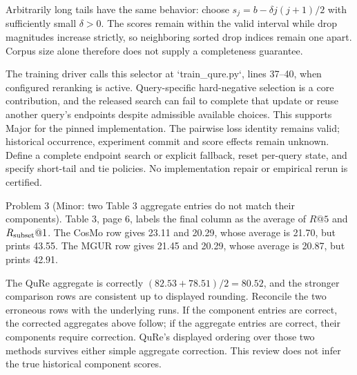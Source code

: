 \documentclass[10pt]{article}
\begin{document}
Arbitrarily long tails have the same behavior: choose \(s_j=b-\delta j(j+1)/2\) with sufficiently small \(\delta>0\). The scores remain within the valid interval while drop magnitudes increase strictly, so neighboring sorted drop indices remain one apart. Corpus size alone therefore does not supply a completeness guarantee.\par
The training driver calls this selector at `train\_qure.py`, lines 37–40, when configured reranking is active. Query-specific hard-negative selection is a core contribution, and the released search can fail to complete that update or reuse another query’s endpoints despite admissible available choices. This supports Major for the pinned implementation. The pairwise loss identity remains valid; historical occurrence, experiment commit and score effects remain unknown. Define a complete endpoint search or explicit fallback, reset per-query state, and specify short-tail and tie policies. No implementation repair or empirical rerun is certified.\par
Problem 3 (Minor: two Table 3 aggregate entries do not match their components).  Table 3, page 6, labels the final column as the average of \(R@5\) and \(R_{\rm subset}@1\). The CosMo row gives 23.11 and 20.29, whose average is 21.70, but prints 43.55. The MGUR row gives 21.45 and 20.29, whose average is 20.87, but prints 42.91.\par
The QuRe aggregate is correctly \((82.53+78.51)/2=80.52\), and the stronger comparison rows are consistent up to displayed rounding. Reconcile the two erroneous rows with the underlying runs. If the component entries are correct, the corrected aggregates above follow; if the aggregate entries are correct, their components require correction. QuRe’s displayed ordering over those two methods survives either simple aggregate correction. This review does not infer the true historical component scores.\par
\end{document}
